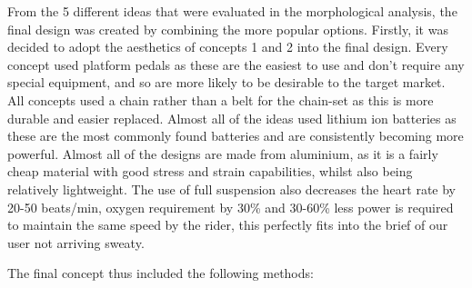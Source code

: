 \documentclass[a4paper,11pt]{article}
\begin{document}
From the 5 different ideas that were evaluated in the morphological analysis, the final design was created by combining the more popular options. Firstly, it was decided to adopt the aesthetics of concepts 1 and 2 into the final design. Every concept used platform pedals as these are the easiest to use and don't require any special equipment, and so are more likely to be desirable to the target market. All concepts used a chain rather than a belt for the chain-set as this is more durable and easier replaced. Almost all of the ideas used lithium ion batteries as these are the most commonly found batteries and are consistently becoming more powerful. Almost all of the designs are made from aluminium, as it is a fairly cheap material with good stress and strain capabilities, whilst also being relatively lightweight. The use of full suspension also decreases the heart rate by 20-50 beats/min, oxygen requirement by 30\% and 30-60\% less power is required to maintain the same speed by the rider, this perfectly fits into the brief of our user not arriving sweaty.  

The final concept thus included the following methods:
\end{document}
